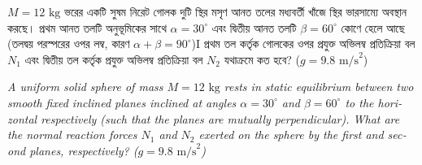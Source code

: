 \documentclass[12pt, a4paper]{article}
\begin{document}
\begin{tcolorbox}[questionbox={প্রশ্ন (Question) 27}]
    \noindent
    $M = 12\text{ kg}$ ভরের একটি সুষম নিরেট গোলক দুটি স্থির মসৃণ আনত তলের মধ্যবর্তী খাঁজে স্থির ভারসাম্যে অবস্থান করছে। প্রথম আনত তলটি অনুভূমিকের সাথে $\alpha = 30^\circ$ এবং দ্বিতীয় আনত তলটি $\beta = 60^\circ$ কোণে হেলে আছে (তলদ্বয় পরস্পরের ওপর লম্ব, কারণ $\alpha + \beta = 90^\circ$)I প্রথম তল কর্তৃক গোলকের ওপর প্রযুক্ত অভিলম্ব প্রতিক্রিয়া বল $N_1$ এবং দ্বিতীয় তল কর্তৃক প্রযুক্ত অভিলম্ব প্রতিক্রিয়া বল $N_2$ যথাক্রমে কত হবে? ($g = 9.8\text{ m/s}^2$)
    
    \vspace{0.8em}
    \begin{english}
    \noindent\textit{\color{darkgray}
    A uniform solid sphere of mass $M = 12\text{ kg}$ rests in static equilibrium between two smooth fixed inclined planes inclined at angles $\alpha = 30^\circ$ and $\beta = 60^\circ$ to the horizontal respectively (such that the planes are mutually perpendicular). What are the normal reaction forces $N_1$ and $N_2$ exerted on the sphere by the first and second planes, respectively? ($g = 9.8\text{ m/s}^2$)
    }
    \end{english}
\end{tcolorbox}

\vspace{1em}
\begin{center}
\end{center}
\vspace{1em}
\end{document}
